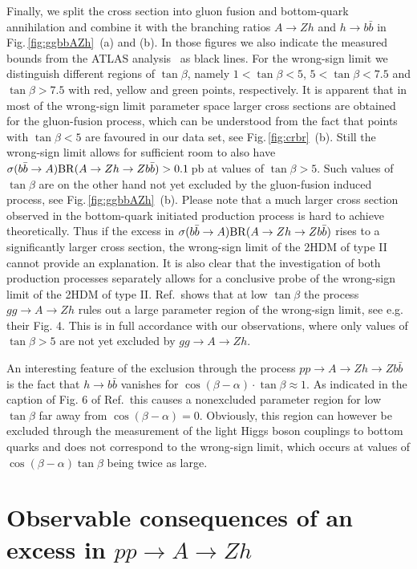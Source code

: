 \documentclass[12pt]{article}
\newcommand{\citere}[1]{Ref.\,\cite{#1}}
\newcommand{\abbrev}{\scalefont{.9}}
\newcommand{\fig}[1]{Fig.\,\ref{#1}}
\newcommand{\thdm}{{\abbrev 2HDM}}
\newcommand{\atlas}{{\abbrev ATLAS}}
\begin{document}
Finally, we split the cross section into gluon fusion and bottom-quark annihilation and combine
it with the branching ratios $A\to Zh$ and $h\to b\bar b$ in \fig{fig:ggbbAZh}~(a) and (b).
In those figures we also indicate the measured bounds from the \atlas{} analysis~\cite{ATLAS:2017nxi} as black lines.
For the wrong-sign limit we distinguish different regions of $\tan\beta$, namely
$1<\tan\beta<5$, $5<\tan\beta<7.5$ and $\tan\beta>7.5$ with red, yellow and green points, respectively.
It is apparent that in most of the wrong-sign limit parameter space larger cross sections are obtained for
the gluon-fusion process, which can be understood from the fact that points with $\tan\beta<5$
are favoured in our data set, see \fig{fig:crbr}~(b). Still the wrong-sign limit allows for sufficient room to also
have $\sigma(b\bar b\to A){\rm BR}(A\to Zh\to Z b\bar b)>0.1$\,pb at values of $\tan\beta>5$.
Such values of $\tan\beta$ are on the other hand not yet excluded by the gluon-fusion induced process, see \fig{fig:ggbbAZh}~(b).
Please note that a much larger cross section observed in the bottom-quark initiated production process is hard to achieve theoretically.
Thus if the excess in $\sigma(b\bar b\to A){\rm BR}(A\to Zh\to Z b\bar b)$ rises to a significantly larger cross section,
the wrong-sign limit of the \thdm{} of type II cannot provide an explanation.
It is also clear that the investigation
of both production processes separately allows for a conclusive probe of the wrong-sign limit of the \thdm{} of type II.
\citere{Han:2017pfo} shows that at low $\tan\beta$ the process $gg\to A\to Zh$ rules out a large
parameter region of the wrong-sign limit, see e.g. their Fig. 4. This is in full accordance with our observations,
where only values of $\tan\beta>5$ are not yet excluded by $gg\to A\to Zh$.

An interesting feature of the exclusion through the process $pp \to A\to Zh\to Zb\bar b$ is the fact
that $h\to b\bar b$ vanishes for $\cos(\beta-\alpha)\cdot \tan\beta \approx 1$. As indicated in
the caption of Fig. 6 of \citere{ATLAS:2017nxi} this causes a nonexcluded parameter region for low $\tan\beta$
far away from $\cos(\beta-\alpha)=0$. Obviously, this region can however be excluded through the measurement
of the light Higgs boson couplings to bottom quarks and does not correspond to the wrong-sign limit, which occurs
at values of $\cos(\beta-\alpha)\tan\beta$ being twice as large.

\section{Observable consequences of an excess in $pp \to A\to Zh$}
\label{sec:otheraspects}
\end{document}
